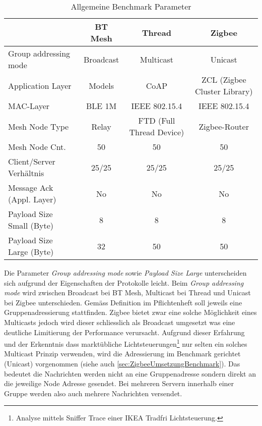\begin{table}[h]
\centering
\begin{adjustbox}{width=1\textwidth}
\begin{tabular}{lccc} 
\toprule
 & BT Mesh & Thread & Zigbee \\ 
\hline
Group addressing mode & Broadcast & Multicast & Unicast \\
Application Layer & Models & CoAP & ZCL (Zigbee Cluster Library) \\
MAC-Layer & BLE 1M & IEEE 802.15.4 & IEEE 802.15.4 \\
Mesh Node Type & Relay & FTD (Full Thread Device) & Zigbee-Router \\
Mesh Node Cnt. & 50 & 50 & 50 \\
Client/Server Verhältnis & 25/25 & 25/25 & 25/25 \\
Message Ack (Appl. Layer) & No & No & No \\
Payload Size Small (Byte) & 8 & 8 & 8 \\
Payload Size Large (Byte) & 32 & 50 & 50 \\
\bottomrule
\end{tabular}
\end{adjustbox}
\caption{Allgemeine Benchmark Parameter}
\label{tab:AllgemeineBenchmarkParameter}
\end{table}

Die Parameter \textit{Group addressing mode} sowie \textit{Payload Size Large} unterscheiden sich aufgrund der Eigenschaften der Protokolle leicht.
Beim \textit{Group addressing mode} wird zwischen Broadcast bei BT Mesh, Multicast bei Thread und Unicast bei Zigbee unterschieden. Gemäss Definition im Pflichtenheft soll jeweils eine Gruppenadressierung stattfinden. Zigbee bietet zwar eine solche Möglichkeit eines Multicasts jedoch wird dieser schliesslich als Broadcast umgesetzt was eine deutliche Limitierung der Performance verursacht.
Aufgrund dieser Erfahrung und der Erkenntnis dass marktübliche Lichtsteuerungen\footnote{Analyse mittels Sniffer Trace einer IKEA Tradfri Lichtsteuerung.} nur selten ein solches Multicast Prinzip verwenden, wird die Adressierung im Benchmark gerichtet (Unicast) vorgenommen (siehe auch \ref{sec:ZigbeeUmsetzungBenchmark}).
Das bedeutet die Nachrichten werden nicht an eine Gruppenadresse sondern direkt an die jeweilige Node Adresse gesendet. Bei mehreren Servern innerhalb einer Gruppe werden also auch mehrere Nachrichten versendet.

